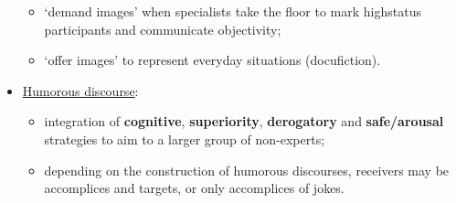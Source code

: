 \begin{itemize}
\begin{itemize}
\item ‘demand images’ when specialists take the floor to mark highstatus participants and communicate objectivity;
\item ‘offer images’ to represent everyday situations (docufiction).
\end{itemize}

\item\underline{Humorous discourse}:

\begin{itemize}

\item integration of \textbf{cognitive}, \textbf{superiority}, \textbf{derogatory} and \textbf{safe/arousal} strategies to aim to a larger group of non-experts;
\item depending on the construction of humorous discourses, receivers may be accomplices and targets, or only accomplices of jokes. 
\end{itemize}

\end{itemize}